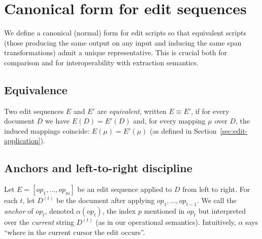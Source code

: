 \documentclass{article}
\newcommand{\doc}{\operatorname{doc}}
\newcommand{\tup}{\operatorname{tup}}
\begin{document}






\section{Canonical form for edit sequences}

We define a canonical (normal) form for edit scripts so that equivalent scripts
(those producing the same output on any input and inducing the same span
transformations) admit a unique representative. This is crucial both for
comparison and for interoperability with extraction semantics.

\subsection{Equivalence}

Two edit sequences $E$ and $E'$ are \emph{equivalent}, written $E \equiv E'$, if
for every document $D$ we have $E(D)=E'(D)$ and, for every mapping $\mu$ over $D$,
the induced mappings coincide: $E(\mu)=E'(\mu)$ (as defined in Section~\ref{sec:edit-application}).

\subsection{Anchors and left-to-right discipline}

Let $E=[op_1,\dots,op_m]$ be an edit sequence applied to $D$ from left to right.
For each $t$, let $D^{(t)}$ be the document after applying $op_1,\dots,op_{t-1}$.
We call the \emph{anchor} of $op_t$, denoted $\alpha(op_t)$, the index $p$ mentioned
in $op_t$ but interpreted over the \emph{current} string $D^{(t)}$ (as in our operational
semantics). Intuitively, $\alpha$ says “where in the current cursor the edit occurs”.
\end{document}
